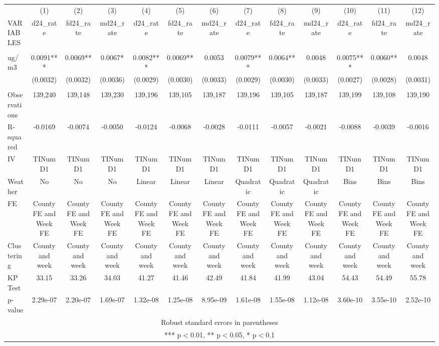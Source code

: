 \begin{tabular}{lcccccccccccc} \hline
 & (1) & (2) & (3) & (4) & (5) & (6) & (7) & (8) & (9) & (10) & (11) & (12) \\
VARIABLES & d24\_rate & fd24\_rate & md24\_rate & d24\_rate & fd24\_rate & md24\_rate & d24\_rate & fd24\_rate & md24\_rate & d24\_rate & fd24\_rate & md24\_rate \\ \hline
 &  &  &  &  &  &  &  &  &  &  &  &  \\
ug/m3 & 0.0091*** & 0.0069** & 0.0067* & 0.0082*** & 0.0069** & 0.0053 & 0.0079*** & 0.0064** & 0.0048 & 0.0075*** & 0.0060** & 0.0048 \\
 & (0.0032) & (0.0032) & (0.0036) & (0.0029) & (0.0030) & (0.0033) & (0.0029) & (0.0030) & (0.0033) & (0.0027) & (0.0028) & (0.0031) \\
 &  &  &  &  &  &  &  &  &  &  &  &  \\
Observations & 139,240 & 139,148 & 139,230 & 139,196 & 139,105 & 139,187 & 139,196 & 139,105 & 139,187 & 139,199 & 139,108 & 139,190 \\
R-squared & -0.0169 & -0.0074 & -0.0050 & -0.0124 & -0.0068 & -0.0028 & -0.0111 & -0.0057 & -0.0021 & -0.0088 & -0.0039 & -0.0016 \\
IV & TINumD1 & TINumD1 & TINumD1 & TINumD1 & TINumD1 & TINumD1 & TINumD1 & TINumD1 & TINumD1 & TINumD1 & TINumD1 & TINumD1 \\
Weather & No & No & No & Linear & Linear & Linear & Quadratic & Quadratic & Quadratic & Bins & Bins & Bins \\
FE & County FE and Week FE & County FE and Week FE & County FE and Week FE & County FE and Week FE & County FE and Week FE & County FE and Week FE & County FE and Week FE & County FE and Week FE & County FE and Week FE & County FE and Week FE & County FE and Week FE & County FE and Week FE \\
Clustering & County and week & County and week & County and week & County and week & County and week & County and week & County and week & County and week & County and week & County and week & County and week & County and week \\
KP Test & 33.15 & 33.26 & 34.03 & 41.27 & 41.46 & 42.49 & 41.84 & 41.99 & 43.04 & 54.43 & 54.49 & 55.78 \\
 p-value & 2.29e-07 & 2.20e-07 & 1.69e-07 & 1.32e-08 & 1.25e-08 & 8.95e-09 & 1.61e-08 & 1.55e-08 & 1.12e-08 & 3.60e-10 & 3.55e-10 & 2.52e-10 \\ \hline
\multicolumn{13}{c}{ Robust standard errors in parentheses} \\
\multicolumn{13}{c}{ *** p$<$0.01, ** p$<$0.05, * p$<$0.1} \\
\end{tabular}

